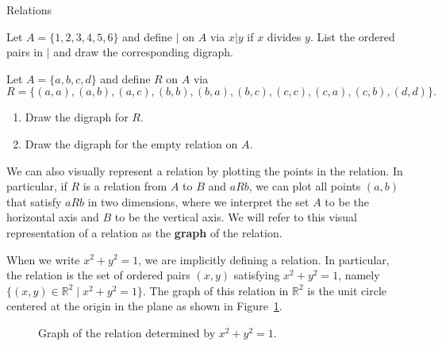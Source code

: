 \begin{section}{Relations}
\begin{problem}\label{prob:divides}
Let $A=\{1,2,3,4,5,6\}$ and define $|$ on $A$ via $x|y$ if $x$ divides $y$.  List the ordered pairs in $|$ and draw the corresponding digraph.
\end{problem}

\begin{problem}\label{prob:another relation on finite}
Let $A=\{a,b,c,d\}$ and define $R$ on $A$ via
\[
{R}=\{(a,a),(a,b),(a,c),(b,b),(b,a),(b,c),(c,c),(c,a),(c,b),(d,d)\}.
\]  
\begin{enumerate}[label=\textrm{(\alph*)}]
\item Draw the digraph for $R$.
\item Draw the digraph for the empty relation on $A$.
\end{enumerate}
\end{problem}


We can also visually represent a relation by plotting the points in the relation.  In particular, if $R$ is a relation from $A$ to $B$ and $aR b$, we can plot all points $(a,b)$ that satisfy $aR b$ in two dimensions, where we interpret the set $A$ to be the horizontal axis and $B$ to be the vertical axis. We will refer to this visual representation of a relation as the \textbf{graph} of the relation.

\begin{example}\label{ex:circle}
When we write $x^2+y^2=1$, we are implicitly defining a relation.  In particular, the relation is the set of ordered pairs $(x,y)$ satisfying $x^2+y^2=1$, namely $\{(x,y)\in \mathbb{R}^2 \mid x^2+y^2=1\}$. The graph of this relation in $\mathbb{R}^2$ is the unit circle centered at the origin in the plane as shown in Figure~\ref{fig:unit circle}.
\end{example}

\begin{figure}[h!]
\centering
{}
\caption{Graph of the relation determined by $x^2+y^2=1$.}\label{fig:unit circle}
\end{figure}


\end{section}
